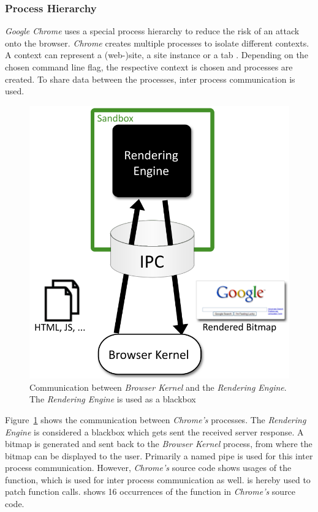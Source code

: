 \subsubsection{Process Hierarchy}
\emph{Google Chrome} uses a special process hierarchy to reduce the risk of an attack onto the browser. \emph{Chrome} creates multiple processes to isolate different contexts. A context can represent a (web-)site, a site instance or a tab \cite{chromium_process_models}. Depending on the chosen command line flag, the respective context is chosen and processes are created. To share data between the processes, inter process communication is used.
\begin{figure}[h]
\centering
\includegraphics[scale=0.5]{sections/background/chrome/communication.png}
\caption{Communication between \emph{Browser Kernel} and the \emph{Rendering Engine}. The \emph{Rendering Engine} is used as a blackbox \cite{chromium_security_architecture}}
\label{fig:chrome_communication}
\end{figure}
Figure~\ref{fig:chrome_communication} shows the communication between \emph{Chrome's} processes. The \emph{Rendering Engine} is considered a blackbox which gets sent the received server response. A bitmap is generated and sent back to the \emph{Browser Kernel} process, from where the bitmap can be displayed to the user. Primarily a named pipe \cite{chromium_security_architecture} is used for this inter process communication. However, \emph{Chrome's} source code shows usages of the  function, which is used for inter process communication as well.  is hereby used to patch function calls. \cite{chromium_source_writeprocessmemory} shows 16 occurrences of the  function in \emph{Chrome's} source code.